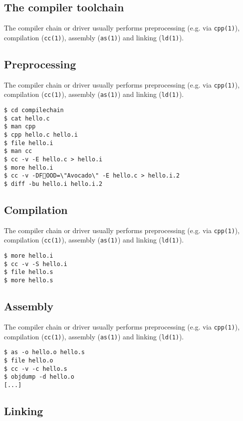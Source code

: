 \documentclass[xga]{xdvislides}
\begin{document}
\subsection{The compiler toolchain}

The compiler chain or driver usually performs
preprocessing (e.g. via {\tt cpp(1)}), compilation
({\tt cc(1)}), assembly ({\tt as(1)}) and linking
({\tt ld(1)}).

\subsection{Preprocessing}

The compiler chain or driver usually performs
preprocessing (e.g. via {\tt cpp(1)}), compilation
({\tt cc(1)}), assembly ({\tt as(1)}) and linking
({\tt ld(1)}).

\begin{verbatim}
$ cd compilechain
$ cat hello.c
$ man cpp
$ cpp hello.c hello.i
$ file hello.i
$ man cc
$ cc -v -E hello.c > hello.i
$ more hello.i
$ cc -v -DFOOD=\"Avocado\" -E hello.c > hello.i.2
$ diff -bu hello.i hello.i.2
\end{verbatim}

\subsection{Compilation}

The compiler chain or driver usually performs
preprocessing (e.g. via {\tt cpp(1)}), compilation
({\tt cc(1)}), assembly ({\tt as(1)}) and linking
({\tt ld(1)}).

\begin{verbatim}
$ more hello.i
$ cc -v -S hello.i
$ file hello.s
$ more hello.s
\end{verbatim}

\subsection{Assembly}

The compiler chain or driver usually performs
preprocessing (e.g. via {\tt cpp(1)}), compilation
({\tt cc(1)}), assembly ({\tt as(1)}) and linking
({\tt ld(1)}).

\begin{verbatim}
$ as -o hello.o hello.s
$ file hello.o
$ cc -v -c hello.s
$ objdump -d hello.o
[...]
\end{verbatim}

\subsection{Linking}
\end{document}
